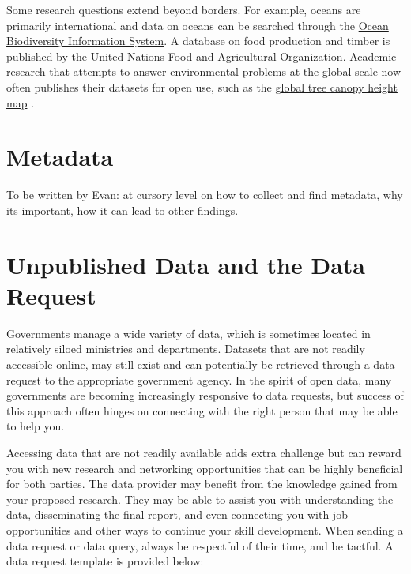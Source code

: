 \documentclass[
]{book}
\begin{document}
Some research questions extend beyond borders. For example, oceans are primarily international and data on oceans can be searched through the \href{https://obis.org/}{Ocean Biodiversity Information System}. A database on food production and timber is published by the \href{http://www.fao.org/faostat/en/}{United Nations Food and Agricultural Organization}. Academic research that attempts to answer environmental problems at the global scale now often publishes their datasets for open use, such as the \href{https://glad.umd.edu/dataset/gedi}{global tree canopy height map} \citep{potapov_mapping_2021}.

\hypertarget{metadata}{%
\section{Metadata}\label{metadata}}

To be written by Evan: at cursory level on how to collect and find metadata, why its important, how it can lead to other findings.

\hypertarget{unpublished-data-and-the-data-request}{%
\section{Unpublished Data and the Data Request}\label{unpublished-data-and-the-data-request}}

Governments manage a wide variety of data, which is sometimes located in relatively siloed ministries and departments. Datasets that are not readily accessible online, may still exist and can potentially be retrieved through a data request to the appropriate government agency. In the spirit of open data, many governments are becoming increasingly responsive to data requests, but success of this approach often hinges on connecting with the right person that may be able to help you.

Accessing data that are not readily available adds extra challenge but can reward you with new research and networking opportunities that can be highly beneficial for both parties. The data provider may benefit from the knowledge gained from your proposed research. They may be able to assist you with understanding the data, disseminating the final report, and even connecting you with job opportunities and other ways to continue your skill development. When sending a data request or data query, always be respectful of their time, and be tactful. A data request template is provided below:
\end{document}
